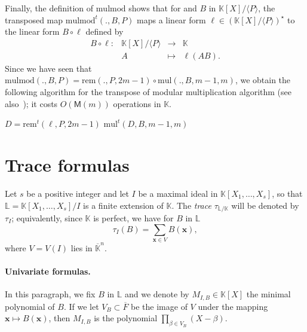 \documentclass[12pt]{article}
\def\M {\ensuremath{\mathsf{M}}}
\def\K {\ensuremath{\mathbb{K}}}
\def\L {\ensuremath{\mathbb{L}}}
\def\mul {\ensuremath{\mathrm{mul}}}
\def\rem {\ensuremath{\mathrm{rem}}}
\def\mulmod {\ensuremath{\mathrm{mulmod}}}
\def\x {\ensuremath{\mathbf{x}}}
\begin{document}
Finally, the definition of $\mulmod$ shows that for and $B$ in
$\K[X]/\langle P \rangle$, the transposed map $\mulmod^t(.,B,P)$ maps
a linear form $\ell \in (\K[X]/\langle P \rangle)^\star$ to the linear
form $B \circ \ell$ defined by
$$
\begin{array}{cccc}
B \circ \ell: &\K[X]/\langle P \rangle &\to& \K  \\
& A & \mapsto & \ell(A B).
\end{array}$$
Since we have seen that $\mulmod(.,B,P) = \rem(.,P,2m-1) \circ \mul(.,B,m-1,m)$,
we obtain the following algorithm for the transpose of modular multiplication
algorithm (see also~\cite{shoup99,bostan+lecerf+schost:tellegen});
it costs $O(\M(m))$ operations in $\K$.


\begin{algorithm}[H]
  \caption{$\mulmod^t(\ell,B,P)$}
  \begin{algorithmic}[1]
    \STATE $D = \rem^t(\ell,P,2m-1)$
    \RETURN $\mul^t(D, B, m-1, m)$
  \end{algorithmic}
\end{algorithm}


\section{Trace formulas} 

Let $s$ be a positive integer and let $I$ be a maximal ideal in
$\K[X_1,\dots,X_s]$, so that $\L=\K[X_1,\dots,X_s]/I$ is a finite
extension of $\K$.  The {\em trace} $\tau_{\L/\K}$ will be denoted by
$\tau_I$; equivalently, since $\K$ is perfect, we have for $B$ in $\L$
\begin{equation}\label{eq:tr}
\tau_{I}(B)=\sum_{\x \in V} B(\x),
\end{equation}
where $V=V(I)$ lies in $\overline{\K}^n$. 

\paragraph{Univariate formulas.} In this paragraph, we fix $B$ in $\L$ and we 
denote by $M_{I,B} \in \K[X]$ the minimal polynomial of $B$. If we let
$V_B \subset \overline{F}$ be the image of $V$ under the mapping $\x \mapsto
B(\x)$, then $M_{I,B}$ is the polynomial $\prod_{\beta \in
  V_B}(X-\beta)$.
\end{document}
